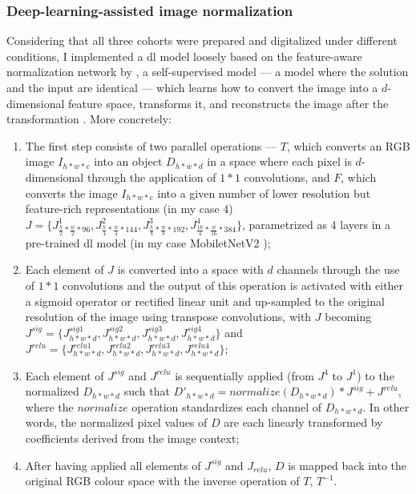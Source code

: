\subsubsection{Deep-learning-assisted image normalization}

Considering that all three cohorts were prepared and digitalized under different conditions, I implemented a \ac{dl} model loosely based on the feature-aware normalization network by , a self-supervised model --- a model where the solution and the input are identical --- which learns how to convert the image into a $d$-dimensional feature space, transforms it, and reconstructs the image after the transformation \cite{Bug2017-kk}. More concretely:

\begin{enumerate}
    \item The first step consists of two parallel operations --- $T$, which converts an RGB image $I_{h*w*c}$ into an object $D_{h*w*d}$ in a space where each pixel is $d$-dimensional through the application of $1*1$ convolutions, and $F$, which converts the image $I_{h*w*c}$ into a given number of lower resolution but feature-rich representations (in my case 4) $J = \{J_{\frac{h}{2}*\frac{w}{2}*96}^1,J_{\frac{h}{4}*\frac{w}{4}*144}^2,J_{\frac{h}{8}*\frac{w}{8}*192}^3,J_{\frac{16}{4}*\frac{w}{16}*384}^4\}$, parametrized as 4 layers in a pre-trained \ac{dl} model (in my case MobiletNetV2 \cite{Sandler2018-bd});
    \item Each element of $J$ is converted into a space with $d$ channels through the use of $1*1$ convolutions and the output of this operation is activated with either a sigmoid operator or rectified linear unit and up-sampled to the original resolution of the image using transpose convolutions, with $J$ becoming $J^{sig} = \{J_{h*w*d}^{sig1},J_{h*w*d}^{sig2},J_{h*w*d}^{sig3},J_{h*w*d}^{sig4}\}$ and $J^{relu} = \{J_{h*w*d}^{relu1},J_{h*w*d}^{relu2},J_{h*w*d}^{relu3},J_{h*w*d}^{relu4}\}$;
    \item Each element of $J^{sig}$ and $J^{relu}$ is sequentially applied (from $J^4$ to $J^1$) to the normalized $D_{h*w*d}$ such that $D'_{h*w*d} = normalize(D_{h*w*d}) * J^{sig} + J^{relu}$, where the $normalize$ operation standardizes each channel of $D_{h*w*d}$. In other words, the normalized pixel values of $D$ are each linearly transformed by coefficients derived from the image context; 
    \item After having applied all elements of $J^{sig}$ and $J_{relu}$, $D$ is mapped back into the original RGB colour space with the inverse operation of $T$, $T^{-1}$.
\end{enumerate}

